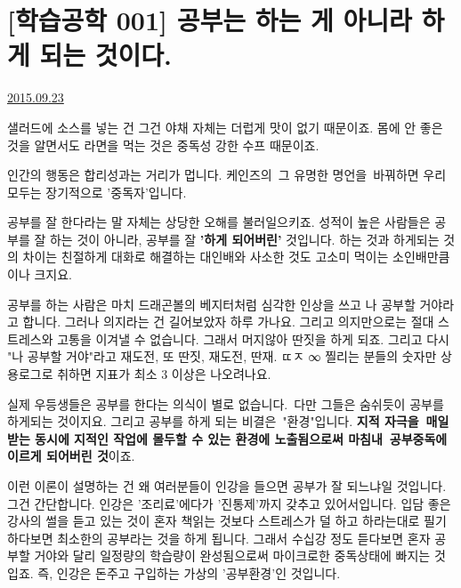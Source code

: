 


\section{[학습공학 001] 공부는 하는 게 아니라 하게 되는 것이다.}

\href{https://www.kockoc.com/Apoc/339548}{2015.09.23}

\vspace{5mm}

샐러드에 소스를 넣는 건 그건 야채 자체는 더럽게 맛이 없기 때문이죠.
몸에 안 좋은 것을 알면서도 라면을 먹는 것은 중독성 강한 수프 때문이죠.
\vspace{5mm}

인간의 행동은 합리성과는 거리가 멉니다.
케인즈의 그 유명한 명언을 바꿔하면 우리 모두는 장기적으로 '중독자'입니다.
\vspace{5mm}

공부를 잘 한다라는 말 자체는 상당한 오해를 불러일으키죠.
성적이 높은 사람들은 공부를 잘 하는 것이 아니라, 공부를 잘 \textbf{'하게 되어버린'} 것입니다.
하는 것과 하게되는 것의 차이는 친절하게 대화로 해결하는 대인배와 사소한 것도 고소미 먹이는 소인배만큼이나 크지요.
\vspace{5mm}

공부를 하는 사람은 마치 드래곤볼의 베지터처럼 심각한 인상을 쓰고 나 공부할 거야라고 합니다.
그러나 의지라는 건 길어보았자 하루 가나요. 그리고 의지만으로는 절대 스트레스와 고통을 이겨낼 수 없습니다.
그래서 머지않아 딴짓을 하게 되죠. 그리고 다시 "나 공부할 거야"라고 재도전, 또 딴짓, 재도전, 딴재. ㄸㅈ ∞
찔리는 분들의 숫자만 상용로그로 취하면 지표가 최소 3 이상은 나오려나요.
\vspace{5mm}

실제 우등생들은 공부를 한다는 의식이 별로 없습니다. 다만 그들은 숨쉬듯이 공부를 하게되는 것이지요.
그리고 공부를 하게 되는 비결은 "환경"입니다.
\textbf{지적 자극을 매일 받는 동시에 지적인 작업에 몰두할 수 있는 \textbf{환경}에 노출됨으로써 마침내 공부중독에 이르게 되어버린 것}이죠.
\vspace{5mm}

이런 이론이 설명하는 건 왜 여러분들이 인강을 들으면 공부가 잘 되느냐일 것입니다.
그건 간단합니다. 인강은 '조리료'에다가 '진통제'까지 갖추고 있어서입니다.
입담 좋은 강사의 썰을 듣고 있는 것이 혼자 책읽는 것보다 스트레스가 덜 하고
하라는대로 필기하다보면 최소한의 공부라는 것을 하게 됩니다.
그래서 수십강 정도 듣다보면 혼자 공부할 거야와 달리 일정량의 학습량이 완성됨으로써 마이크로한 중독상태에 빠지는 것입죠.
즉, 인강은 돈주고 구입하는 가상의 '공부환경'인 것입니다.
\vspace{5mm}

